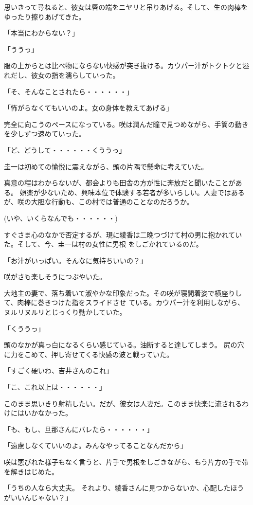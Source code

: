﻿\documentclass[book,tate]{jlreq}
\begin{document}
思いきって尋ねると、彼女は唇の端をニヤリと吊りあげる。そして、生の肉棒をゆったり擦りあげてきた。

「本当にわからない？」

「ううっ」

服の上からとは比べ物にならない快感が突き抜ける。カウパー汁がトクトクと溢れだし、彼女の指を濡らしていった。

「そ、そんなことされたら・・・・・・」

「怖がらなくてもいいのよ。女の身体を教えてあげる」

完全に向こうのペースになっている。咲は潤んだ瞳で見つめながら、手筒の動きを少しずつ速めていった。

「ど、どうして・・・・・・くううっ」

圭一は初めての愉悦に震えながら、頭の片隅で懸命に考えていた。

真意の程はわからないが、都会よりも田舎の方が性に奔放だと聞いたことがある。 娯楽が少ないため、興味本位で体験する若者が多いらしい。人妻ではあるが、咲の大胆な行動も、この村では普通のことなのだろうか。

(いや、いくらなんでも・・・・・・)

すぐさま心のなかで否定するが、現に綾香は二晩つづけて村の男に抱かれていた。そして、今、圭一は村の女性に男根 をしごかれているのだ。

「お汁がいっぱい。そんなに気持ちいいの？」

咲がさも楽しそうにつぶやいた。

大地主の妻で、落ち着いて淑やかな印象だった。その咲が寝間着姿で横座りして、肉棒に巻きつけた指をスライドさせ ている。カウパー汁を利用しながら、 ヌルリヌルリとじっくり動かしていた。

「くううっ」

頭のなかが真っ白になるくらい感じている。油断すると達してしまう。 尻の穴に力をこめて、押し寄せてくる快感の波と戦っていた。

「すごく硬いわ、吉井さんのこれ」

「こ、これ以上は・・・・・・」

このまま思いきり射精したい。だが、彼女は人妻だ。このまま快楽に流されるわけにはいかなかった。

「も、もし、旦那さんにバレたら・・・・・・」

「遠慮しなくていいのよ。みんなやってることなんだから」

咲は悪びれた様子もなく言うと、片手で男根をしごきながら、もう片方の手で帯を解きはじめた。

「うちの人なら大丈夫。 それより、綾香さんに見つからないか、心配したほうがいいんじゃない？」
\end{document}
